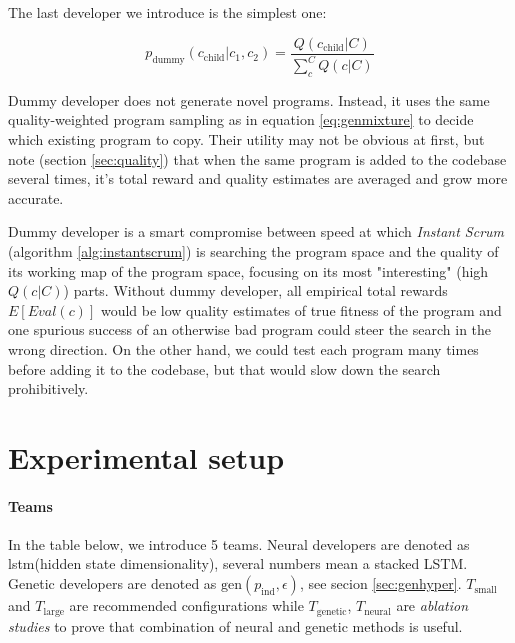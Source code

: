 The last developer we introduce is the simplest one:

\begin{equation}
    p_\text{dummy}(c_\text{child}|c_1,c_2) = 
    \frac{Q(c_\text{child}|C)}{\sum\limits_{c}^{C} Q(c|C)} 
    \label{eq:dummy}
\end{equation}

Dummy developer does not generate novel programs.
Instead, it uses the same quality-weighted program sampling as in equation \ref{eq:genmixture} to decide which existing program to copy.
Their utility may not be obvious at first, but note (section \ref{sec:quality}) that when the same program is added to the codebase several times, it's total reward and quality estimates are averaged and grow more accurate.

Dummy developer is a smart compromise between speed at which \emph{Instant Scrum} (algorithm \ref{alg:instantscrum}) is searching the program space and the quality of its working map of the program space, focusing on its most "interesting" (high $Q(c|C)$) parts. 
Without dummy developer, all empirical total rewards $E[Eval(c)]$ would be low quality estimates of true fitness of the program and one spurious success of an otherwise bad program could steer the search in the wrong direction.
On the other hand, we could test each program many times before adding it to the codebase, but that would slow down the search prohibitively. 

\newpage
\section{Experimental setup}
\label{sec:neurogen-experiments}

\paragraph{Teams}

In the table below, we introduce 5 teams.
Neural developers are denoted as lstm(hidden state dimensionality), several numbers mean a stacked LSTM.
Genetic developers are denoted as $\text{gen}(p_\text{ind},\epsilon)$, see secion \ref{sec:genhyper}.
$T_\text{small}$ and $T_\text{large}$ are recommended configurations while $T_\text{genetic}$, $T_\text{neural}$ are \emph{ablation studies} to prove that combination of neural and genetic methods is useful.

